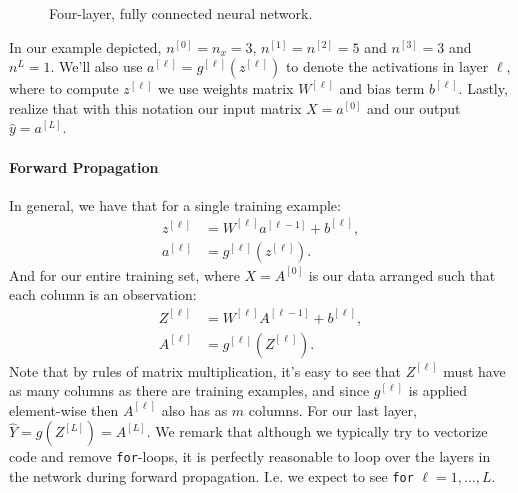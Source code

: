 \documentclass[12pt]{article}
\begin{document}
\begin{figure}[h]
  \caption{Four-layer, fully connected neural network.} \end{figure}
In our example depicted, $n^{[0]} = n_x = 3$, $n^{[1]} = n^{[2]} = 5$ and $n^{[3]} = 3$ and $n^{L} = 1$. We'll also use $a^{[\ell]} = g^{[\ell]}(z^{[\ell]})$ to denote the activations in layer $\ell$, where to compute $z^{[\ell]}$ we use weights matrix $W^{[\ell]}$ and bias term $b^{[\ell]}$. Lastly, realize that with this notation our input matrix $X = a^{[0]}$ and our output $\hat y = a^{[L]}$.

\paragraph{Forward Propagation}
In general, we have that for a single training example:
\begin{align*}   z^{[\ell]} &= W^{[\ell]} a^{[\ell-1]} + b^{[\ell]}, \\ 
  a^{[\ell]} &= g^{[\ell]}(z^{[\ell]}). \end{align*}
And for our entire training set, where $X = A^{[0]}$ is our data arranged such that each column is an observation:
\begin{align*}   Z^{[\ell]} &= W^{[\ell]} A^{[\ell-1]} + b^{[\ell]}, \\ 
  A^{[\ell]} &= g^{[\ell]}(Z^{[\ell]}).    \end{align*}
Note that by rules of matrix multiplication, it's easy to see that $Z^{[\ell]}$ must have as many columns as there are training examples, and since $g^{[\ell]}$ is applied element-wise then $A^{[\ell]}$ also has as $m$ columns.
For our last layer, $\hat Y = g(Z^{[L]}) = A^{[L]}$. We remark that although we typically try to vectorize code and remove \texttt{for}-loops, it is perfectly reasonable to loop over the layers in the network during forward propagation. I.e. we expect to see \texttt{for} $\ell = 1, \ldots, L$.
\end{document}
